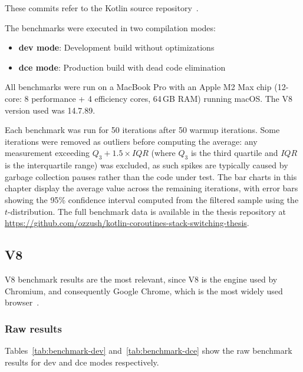 These commits refer to the Kotlin source repository~\cite{kotlin-repo}.

The benchmarks were executed in two compilation modes:

\begin{itemize}
    \item \textbf{dev mode}: Development build without optimizations
    \item \textbf{dce mode}: Production build with dead code elimination
\end{itemize}

All benchmarks were run on a MacBook Pro with an Apple M2 Max chip (12-core: 8 performance + 4 efficiency
cores, 64\,GB RAM) running macOS. The V8 version used was 14.7.89.

Each benchmark was run for 50 iterations after 50 warmup iterations. Some iterations were removed
as outliers before computing the average: any measurement exceeding $Q_3 + 1.5 \times IQR$ (where
$Q_3$ is the third quartile and $IQR$ is the interquartile range) was excluded, as such spikes are
typically caused by garbage collection pauses rather than the code under test. The bar charts in this
chapter display the average value across the remaining iterations, with error bars showing the 95\% confidence
interval computed from the filtered sample using the $t$-distribution.
The full benchmark data is available in the thesis repository at \url{https://github.com/ozzush/kotlin-coroutines-stack-switching-thesis}.

\subsection{V8}

V8 benchmark results are the most relevant, since V8 is the engine used by Chromium, and consequently Google Chrome,
which is the most widely used browser~\cite{statcounter-browser-market-share}.

\subsubsection*{Raw results}

Tables~\ref{tab:benchmark-dev} and~\ref{tab:benchmark-dce} show the raw benchmark results for dev and dce modes respectively.


